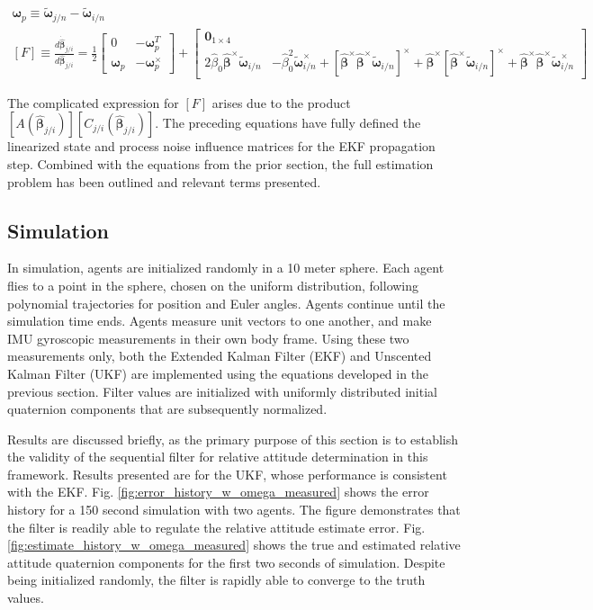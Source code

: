 \documentclass{aiaa-tc}
\newcommand{\B}[1]{\textbf{#1}} %
\newcommand{\BG}[1]{{\bm #1}}           %
\newcommand{\ddarg}[2]{\frac{d#1}{d#2}} %
\begin{document}
\begin{align}
\BG{\omega}_p \equiv \tilde{\BG{\omega}}_{j/n}-\tilde{\BG{\omega}}_{i/n} \\
[F] \equiv \ddarg{\dot{\hat{\BG{\beta}}}_{j/i}}{\hat{\BG{\beta}}_{j/i}} = \frac{1}{2}
\begin{bmatrix}
0 & -\BG{\omega}_p^T \\ \BG{\omega}_p & -\BG{\omega}_p^\times
\end{bmatrix} + \begin{bmatrix}
\B{0}_{1\times 4}\\
2\hat{\beta}_0 \hat{\BG{\beta}}^\times \tilde{\BG{\omega}}_{i/n} & -\hat{\beta}_0^2 \tilde{\BG{\omega}}_{i/n}^\times + [\hat{\BG{\beta}}^\times \hat{\BG{\beta}}^\times \tilde{\BG{\omega}}_{i/n}]^\times + \hat{\BG{\beta}}^\times [\hat{\BG{\beta}}^\times \tilde{\BG{\omega}}_{i/n}]^\times + \hat{\BG{\beta}}^\times \hat{\BG{\beta}}^\times \tilde{\BG{\omega}}_{i/n}^\times 
\end{bmatrix}
\end{align}

The complicated expression for $[F]$ arises due to the product $[A(\hat{\BG{\beta}}_{j/i})][C_{j/i}(\hat{\BG{\beta}}_{j/i})]$. The preceding equations have fully defined the linearized state and process noise influence matrices for the EKF propagation step. Combined with the equations from the prior section, the full estimation problem has been outlined and relevant terms presented.

\subsection{Simulation}

In simulation, agents are initialized randomly in a 10 meter sphere. Each agent flies to a point in the sphere, chosen on the uniform distribution, following polynomial trajectories for position and Euler angles. Agents continue until the simulation time ends. Agents measure unit vectors to one another, and make IMU gyroscopic measurements in their own body frame. Using these two measurements only, both the Extended Kalman Filter (EKF) and Unscented Kalman Filter (UKF) are implemented using the equations developed in the previous section. Filter values are initialized with uniformly distributed initial quaternion components that are subsequently normalized.

Results are discussed briefly, as the primary purpose of this section is to establish the validity of the sequential filter for relative attitude determination in this framework. Results presented are for the UKF, whose performance is consistent with the EKF. Fig. \ref{fig:error_history_w_omega_measured} shows the error history for a 150 second simulation with two agents. The figure demonstrates that the filter is readily able to regulate the relative attitude estimate error. Fig. \ref{fig:estimate_history_w_omega_measured} shows the true and estimated relative attitude quaternion components for the first two seconds of simulation. Despite being initialized randomly, the filter is rapidly able to converge to the truth values.
\end{document}
